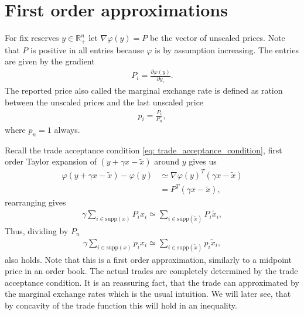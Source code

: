 \section{First order approximations}
For fix reserves $y \in \mathbb{R}_+^{n}$ let $\nabla \varphi(y) = P$ be the
vector of unscaled prices. Note that $P$ is positive in all entries because
$\varphi$ is by assumption increasing. The entries are given by the gradient
\begin{align}
    P_i = \frac{\partial \varphi(y)}{\partial y_i}.
\end{align}
The reported price also called the marginal exchange rate is defined as
ration between the unscaled prices and the last unscaled price
\begin{align}
    p_i = \frac{P_i}{P_n}, \label{eq: marginal_rate}
\end{align}
where $p_n = 1$ always.

Recall the trade acceptance condition \ref{eq: trade_acceptance_condition},
first order Taylor expansion of $(y + \gamma x - \tilde{x})$ around $y$ gives us
\begin{align}
    \varphi(y + \gamma x - \tilde{x}) - \varphi(y) &\simeq \nabla
    \varphi(y)^{T} (\gamma x - \tilde{x}) \\
                   &=P^{T} (\gamma x - \tilde{x}),
\end{align}
rearranging gives
\begin{align}
    \gamma \sum_{i \in \text{supp}(x) } P_i x_i \simeq \sum_{i \in
    \text{supp}(\tilde{x}) } P_i \tilde{x}_i,
\end{align}
Thus, dividing by $P_n$
\begin{align}
    \gamma \sum_{i \in \text{supp}(x) } p_i x_i \simeq \sum_{i \in
    \text{supp}(\tilde{x}) } p_i \tilde{x}_i,
\end{align}
also holds.
Note that this is a first order approximation, similarly to a midpoint price
in an order book. The actual trades are completely determined by the trade
acceptance condition. It is an reassuring fact, that the trade can
approximated by the marginal exchange rates which is the usual intuition. We
will later see, that by concavity of the trade function this will hold in an
inequality.
